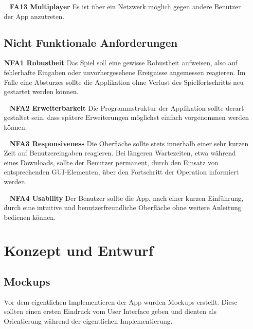 \documentclass{scrartcl}
\begin{document}
\ \newline
\textbf{FA13 Multiplayer} \newline
Es ist über ein Netzwerk möglich gegen andere Benutzer der App anzutreten.


\subsection{Nicht Funktionale Anforderungen}

\textbf{NFA1 Robustheit} \newline
Das Spiel soll eine gewisse Robustheit aufweisen, also auf fehlerhafte Eingaben
oder unvorhergesehene Ereignisse angemessen reagieren. Im Falle eine Absturzes
sollte die Applikation ohne Verlust des Spielfortschritts neu gestartet werden
können.

\ \newline
\textbf{NFA2 Erweiterbarkeit} \newline
Die Programmstruktur der Applikation sollte derart gestaltet sein, dass
spätere Erweiterungen möglichst einfach vorgenommen werden können.

\ \newline
\textbf{NFA3 Responsiveness} \newline
Die Oberfläche sollte stets innerhalb einer sehr kurzen Zeit auf
Benutzereingaben reagieren. Bei längeren Wartezeiten, etwa während eines
Downloads, sollte der Benutzer permanent, durch den Einsatz von entsprechenden
GUI-Elementen, über den Fortschritt der Operation informiert werden.

\ \newline
\textbf{NFA4 Usability} \newline
Der Benutzer sollte die App, nach einer kurzen Einführung, durch eine intuitive
und benutzerfreundliche Oberfläche ohne weitere Anleitung bedienen können.

\section{Konzept und Entwurf}
\subsection{Mockups}
Vor dem eigentlichen Implementieren der App wurden Mockups erstellt. Diese
sollten einen ersten Eindruck vom User Interface geben und dienten als
Orientierung während der eigentlichen Implementierung.
\end{document}
